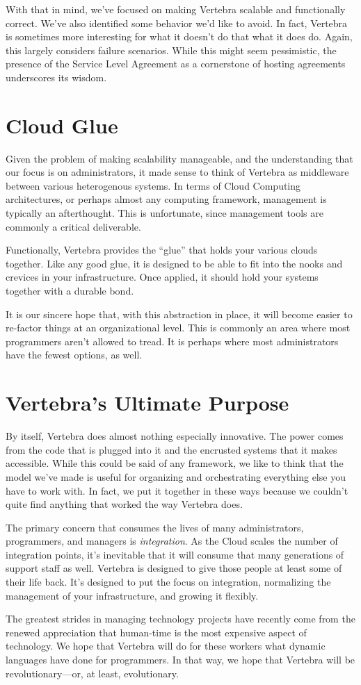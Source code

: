 With that in mind, we've focused on making Vertebra scalable and functionally correct.  We've also identified some behavior we'd like to avoid.  In fact, Vertebra is sometimes more interesting for what it doesn't do that what it does do.  Again, this largely considers failure scenarios.  While this might seem pessimistic, the presence of the Service Level Agreement as a cornerstone of hosting agreements underscores its wisdom.

\section*{Cloud Glue}

Given the problem of making scalability manageable, and the understanding that our focus is on administrators, it made sense to think of Vertebra as middleware between various heterogenous systems.  In terms of Cloud Computing architectures, or perhaps almost any computing framework, management is typically an afterthought.  This is unfortunate, since management tools are commonly a critical deliverable.

Functionally, Vertebra provides the ``glue'' that holds your various clouds together.  Like any good glue, it is designed to be able to fit into the nooks and crevices in your infrastructure.  Once applied, it should hold your systems together with a durable bond.

It is our sincere hope that, with this abstraction in place, it will become easier to re-factor things at an organizational level.  This is commonly an area where most programmers aren't allowed to tread.  It is perhaps where most administrators have the fewest options, as well.

\section*{Vertebra's Ultimate Purpose}

By itself, Vertebra does almost nothing especially innovative.  The power comes from the code that is plugged into it and the encrusted systems that it makes accessible.  While this could be said of any framework, we like to think that the model we've made is useful for organizing and orchestrating everything else you have to work with.  In fact, we put it together in these ways because we couldn't quite find anything that worked the way Vertebra does.

The primary concern that consumes the lives of many administrators, programmers, and managers is \emph{integration}.  As the Cloud scales the number of integration points, it's inevitable that it will consume that many generations of support staff as well.  Vertebra is designed to give those people at least some of their life back.  It's designed to put the focus on integration, normalizing the management of your infrastructure, and growing it flexibly.

The greatest strides in managing technology projects have recently come from the renewed appreciation that human-time is the most expensive aspect of technology.  We hope that Vertebra will do for these workers what dynamic languages have done for programmers.  In that way, we hope that Vertebra will be revolutionary---or, at least, evolutionary.


